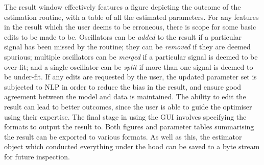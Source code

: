 The result window effectively features a figure depicting the outcome of the
estimation routine, with a table of all the estimated parameters. For any
features in the result which the user deems to be erroneous, there is scope for
some basic edits to be made to be. Oscillators can be \emph{added} to the
result if a particular signal has been missed by the routine; they can be
\emph{removed} if they are deemed spurious; multiple oscillators can be
\emph{merged} if a particular signal is deemed to be over-fit; and a single
oscillator can be \emph{split} if more than one signal is deemed to be
under-fit. If any edits are requested by the user, the updated parameter set is
subjected to \ac{NLP} in order to reduce the bias in the result, and ensure
good agreement between the model and data is maintained. The ability to edit
the result can lead to better outcomes, since the user is able to guide the
optimiser using their expertise. The final stage in using the \ac{GUI}
involves specifying the formats to output the result to. Both figures and
parameter tables summarising the result can be exported to various formats. As
well as this, the estimator object which conducted everything under the hood
can be saved to a byte stream for future inspection.
